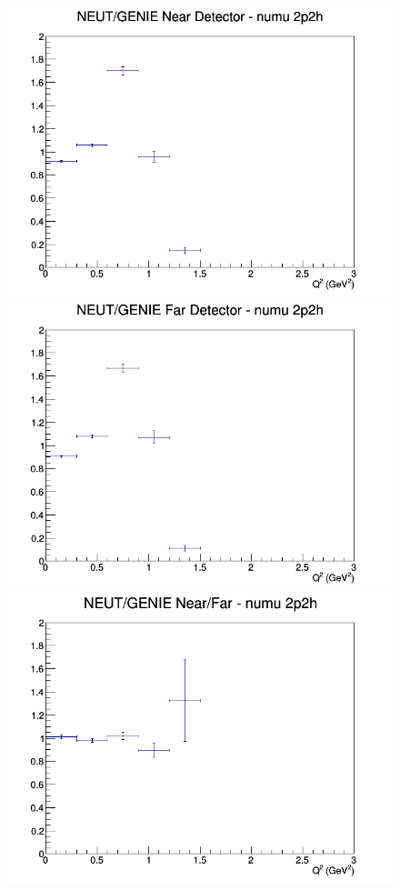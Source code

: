 \documentclass[12pt]{article}
\begin{document}
\begin{figure}[h]
\endminipage
\newline
{}
\includegraphics[width=\linewidth]{Q2/nominal/ratios/2p2h_NEUT_GENIE_numu_near_Q2.png}
\endminipage
{}
\includegraphics[width=\linewidth]{Q2/nominal/ratios/2p2h_NEUT_GENIE_numu_far_Q2.png}
\endminipage
{}
\includegraphics[width=\linewidth]{Q2/nominal/ratios/2p2h_NEUT_GENIE_numu_NF_Q2.png}

\end{figure}
\end{document}
